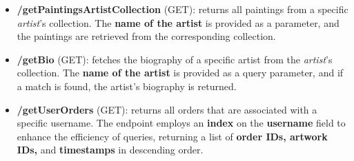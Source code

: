 \documentclass[a4paper,12pt]{article}
\begin{document}
\begin{itemize}
      \item \textbf{/getPaintingsArtistCollection} (GET): returns all paintings from a specific \textit{artist}'s collection. The \textbf{name of the artist} is provided as a parameter, and the paintings are retrieved from the corresponding collection.

      \item \textbf{/getBio} (GET): fetches the biography of a specific artist from the \textit{artist}'s collection. The \textbf{name of the artist} is provided as a query parameter, and if a match is found, the artist's biography is returned.

      \item \textbf{/getUserOrders} (GET): returns all orders that are associated with a specific username. The endpoint employs an \textbf{index} on the \textbf{username} field to enhance the efficiency of queries, returning a list of \textbf{order IDs, artwork IDs,} and \textbf{timestamps} in descending order.

\end{itemize}
\end{document}
